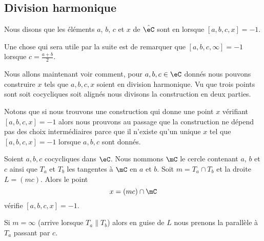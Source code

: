 \subsection{Division harmonique}

\begin{definition}
    Nous disons que les éléments \( a\), \( b\), \( c\) et \( x\) de \( \hat \eC\) sont en  lorsque \( [a,b,c,x]=-1\).
\end{definition}

\begin{normaltext}      \label{NORMooUWYDooAZTTWu}
    Une chose qui sera utile par la suite est de remarquer que \( [a,b,c,\infty]=-1\) lorsque \( c=\frac{ a+b }{ 2 }\).
\end{normaltext}

Nous allons maintenant voir comment, pour \( a,b,c\in \eC\) donnés nous pouvons construire \( x\) tels que \( a,b,c,x\) soient en division harmonique. Vu que trois points sont soit cocycliques soit alignés nous divisons la construction en deux parties.

Notons que si nous trouvons une construction qui donne une point \( x\) vérifiant \( [a,b,c,x]=-1\) alors nous prouvons au passage que la construction ne dépend pas des choix intermédiaires parce que il n'existe qu'un unique \( x\) tel que \( [a,b,c,x]=-1\) lorsque \( a,b,c\) sont donnés.

\begin{lemma}     \label{LEMooAEDTooKsUoPw}
    Soient \( a,b,c\) cocycliques dans \( \eC\). Nous nommons \( \mC\) le cercle contenant \( a\), \( b\) et \( c\) ainsi que \( T_a\) et \( T_b\) les tangentes à \( \mC\) en \( a\) et \( b\). Soit \( m=T_a\cap T_b\) et la droite \( L=(mc)\). Alors le point
    \begin{equation}
        x=(mc)\cap \mC
    \end{equation}
    vérifie \( [a,b,c,x]=-1\).

    Si \( m=\infty\) (arrive lorsque \( T_a\parallel T_b\)) alors en guise de \( L\) nous prenons la parallèle à \( T_a\) passant par \( c\).
\end{lemma}

